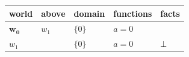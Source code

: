 \documentclass[border=5pt]{standalone}
\begin{document}
\begin{tabular}{lllll}
world & above & domain & functions & facts \\
\hline
$\mathbf{w_{0}}$ & $w_{1}$ & $\{0\}$ & $a = 0$ &  \\
$w_{1}$ &  & $\{0\}$ & $a = 0$ & $\bot$ \\
\end{tabular}
\end{document}
